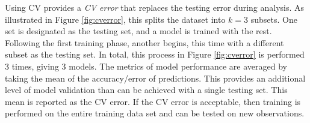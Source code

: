 Using \gls{CV} provides a \textit{\gls{CV} error} that replaces the testing
error during analysis.  As illustrated in Figure \ref{fig:cverror}, this splits
the dataset into $k=3$ subsets. One set is designated as the testing set, and a
model is trained with the rest. Following the first training phase, another
begins, this time with a different subset as the testing set.  In total, this
process in Figure \ref{fig:cverror} is performed $3$ times, giving $3$ models.
The metrics of model performance are averaged by taking the mean of the
accuracy/error of predictions.  This provides an additional level of model
validation than can be achieved with a single testing set. This mean is
reported as the \gls{CV} error. If the \gls{CV} error is acceptable, then
training is performed on the entire training data set and can be tested on new
observations.
